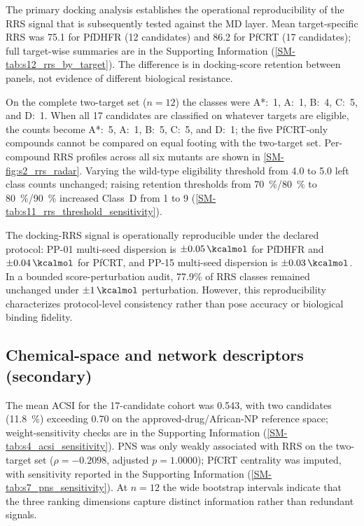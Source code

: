 \documentclass[journal=jcisd8,manuscript=article,layout=traditional]{achemso}
\begin{document}
The primary docking analysis establishes the operational reproducibility of the RRS signal that is subsequently tested against the MD layer. Mean target-specific RRS was 75.1 for PfDHFR (12 candidates) and 86.2 for PfCRT (17 candidates); full target-wise summaries are in the Supporting Information (\cref{SM-tab:s12_rrs_by_target}). The difference is in docking-score retention between panels, not evidence of different biological resistance.

On the complete two-target set ($n=\num{12}$) the classes were A*:~\num{1}, A:~\num{1}, B:~\num{4}, C:~\num{5}, and D:~\num{1}. When all 17 candidates are classified on whatever targets are eligible, the counts become A*:~\num{5}, A:~\num{1}, B:~\num{5}, C:~\num{5}, and D:~\num{1}; the five PfCRT-only compounds cannot be compared on equal footing with the two-target set. Per-compound RRS profiles across all six mutants are shown in \cref{SM-fig:s2_rrs_radar}. Varying the wild-type eligibility threshold from \qty{4.0}{\kcalmol} to \qty{5.0}{\kcalmol} left class counts unchanged; raising retention thresholds from \qty{70}{\percent}/\qty{80}{\percent} to \qty{80}{\percent}/\qty{90}{\percent} increased Class~D from 1 to 9 (\cref{SM-tab:s11_rrs_threshold_sensitivity}).

The docking-RRS signal is operationally reproducible under the declared protocol: PP-01 multi-seed dispersion is $\pm\qty{0.05}{\kcalmol}$ for PfDHFR and $\pm\qty{0.04}{\kcalmol}$ for PfCRT, and PP-15 multi-seed dispersion is $\pm\qty{0.03}{\kcalmol}$. In a bounded score-perturbation audit, 77.9\% of RRS classes remained unchanged under $\pm\qty{1}{\kcalmol}$ perturbation. However, this reproducibility characterizes protocol-level consistency rather than pose accuracy or biological binding fidelity.

\subsection{Chemical-space and network descriptors (secondary)}

The mean ACSI for the 17-candidate cohort was \num{0.543}, with two candidates (\qty{11.8}{\percent}) exceeding \num{0.70} on the approved-drug/African-NP reference space; weight-sensitivity checks are in the Supporting Information (\cref{SM-tab:s4_acsi_sensitivity}). PNS was only weakly associated with RRS on the two-target set ($\rho=\num{-0.2098}$, adjusted $p=\num{1.0000}$); PfCRT centrality was imputed, with sensitivity reported in the Supporting Information (\cref{SM-tab:s7_pns_sensitivity}). At $n=\num{12}$ the wide bootstrap intervals indicate that the three ranking dimensions capture distinct information rather than redundant signals.
\end{document}
